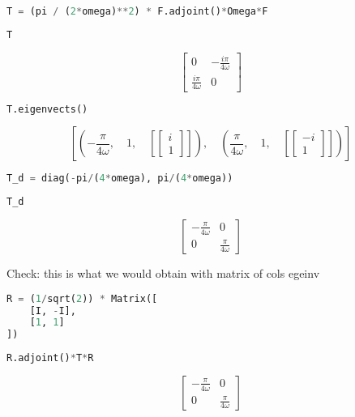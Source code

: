 \begin{lstlisting}[language=Python]
T = (pi / (2*omega)**2) * F.adjoint()*Omega*F
\end{lstlisting}

\begin{lstlisting}[language=Python]
T
\end{lstlisting}

\[\left[\begin{matrix}0 & - \frac{i \pi}{4 \omega}\\\frac{i \pi}{4 \omega} & 0\end{matrix}\right]\]

\begin{lstlisting}[language=Python]
T.eigenvects()
\end{lstlisting}

\[\left [ \left ( - \frac{\pi}{4 \omega}, \quad 1, \quad \left [ \left[\begin{matrix}i\\1\end{matrix}\right]\right ]\right ), \quad \left ( \frac{\pi}{4 \omega}, \quad 1, \quad \left [ \left[\begin{matrix}- i\\1\end{matrix}\right]\right ]\right )\right ]\]

\begin{lstlisting}[language=Python]
T_d = diag(-pi/(4*omega), pi/(4*omega))
\end{lstlisting}

\begin{lstlisting}[language=Python]
T_d
\end{lstlisting}

\[\left[\begin{matrix}- \frac{\pi}{4 \omega} & 0\\0 & \frac{\pi}{4 \omega}\end{matrix}\right]\]

Check: this is what we would obtain with matrix of cols egeinv

\begin{lstlisting}[language=Python]
R = (1/sqrt(2)) * Matrix([
    [I, -I],
    [1, 1]
])
\end{lstlisting}

\begin{lstlisting}[language=Python]
R.adjoint()*T*R
\end{lstlisting}

\[\left[\begin{matrix}- \frac{\pi}{4 \omega} & 0\\0 & \frac{\pi}{4 \omega}\end{matrix}\right]\]


